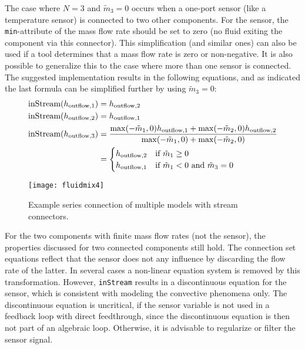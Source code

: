 The case where $N=3$ and $\tilde{m}_3=0$ occurs when a one-port sensor (like a temperature sensor) is connected to two other components.
For the sensor, the \lstinline!min!-attribute of the mass flow rate should be set to zero (no fluid exiting the component via this connector).
This simplification (and similar ones) can also be used if a tool determines that a mass flow rate is zero or non-negative.
It is also possible to generalize this to the case where more than one sensor is connected.
The suggested implementation results in the following equations, and as indicated the last formula can be simplified further by using $\tilde{m}_3=0$:
\begin{align*}
\text{\lstinline!inStream!}(h_{\mathrm{outflow},1}) &= h_{\mathrm{outflow},2}\\
\text{\lstinline!inStream!}(h_{\mathrm{outflow},2}) &= h_{\mathrm{outflow},1}\\
\text{\lstinline!inStream!}(h_{\mathrm{outflow},3}) &= \frac{\operatorname{max}(-\tilde{m}_1,0)h_{\mathrm{outflow},1}+\operatorname{max}(-\tilde{m}_2,0)h_{\mathrm{outflow},2}}{\operatorname{max}(-\tilde{m}_1,0)+\operatorname{max}(-\tilde{m}_2,0)}\\
&=
\begin{cases}
h_{\mathrm{outflow},2}&\text{if $\tilde{m}_1 \geq 0$}\\
h_{\mathrm{outflow},1}&\text{if $\tilde{m}_1 < 0$ and $\tilde{m}_3 = 0$}
\end{cases}
\end{align*}
\begin{figure}[H]
  \begin{center}
    \texttt{[image: fluidmix4]}
  \end{center}
  \caption{
    Example series connection of multiple models with stream connectors.
  }
\end{figure}

For the two components with finite mass flow rates (not the sensor), the properties discussed for two connected components still hold.
The connection set equations reflect that the sensor does not any influence by discarding the flow rate of the latter.
In several cases a non-linear equation system is removed by this transformation.
However, \lstinline!inStream! results in a discontinuous equation for the sensor, which is consistent with modeling the convective phenomena only.
The discontinuous equation is uncritical, if the sensor variable is not used in a feedback loop with direct feedthrough, since the discontinuous equation is then not part of an algebraic loop.
Otherwise, it is advisable to regularize or filter the sensor signal.

